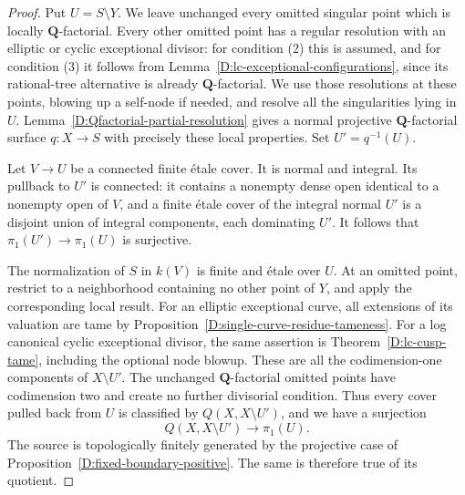 \begin{proof}
Put $U=S\setminus Y$.  We leave unchanged every omitted singular
point which is locally $\mathbf Q$-factorial.  Every other omitted
point has a regular resolution with an elliptic or cyclic
exceptional divisor: for condition (2) this is assumed, and for
condition (3) it follows from
Lemma~\ref{D:lc-exceptional-configurations}, since its rational-tree
alternative is already $\mathbf Q$-factorial.
We use those resolutions at these points, blowing up a self-node
if needed, and resolve all the singularities lying in $U$.
Lemma~\ref{D:Qfactorial-partial-resolution} gives a normal
projective $\mathbf Q$-factorial surface $q:X\to S$ with precisely
these local properties.  Set $U'=q^{-1}(U)$.

Let $V\to U$ be a connected finite \'etale cover.  It is normal
and integral.  Its pullback to $U'$ is connected: it contains a
nonempty dense open identical to a nonempty open of $V$, and a
finite \'etale cover of the integral normal $U'$ is a disjoint
union of integral components, each dominating $U'$.
It follows that $\pi_1(U')\to\pi_1(U)$ is surjective.

The normalization of $S$ in $k(V)$ is finite and \'etale over $U$.
At an omitted point, restrict to a neighborhood containing no
other point of $Y$, and apply the corresponding local result.
For an elliptic exceptional curve, all extensions of its valuation
are tame by Proposition~\ref{D:single-curve-residue-tameness}.
For a log canonical cyclic exceptional divisor, the same assertion
is Theorem~\ref{D:lc-cusp-tame}, including the optional node blowup.
These are all the codimension-one components of $X\setminus U'$.
The unchanged $\mathbf Q$-factorial omitted points have codimension
two and create no further divisorial condition.
Thus every cover pulled back from $U$ is classified by
$Q(X,X\setminus U')$, and we have a surjection
\[
 Q(X,X\setminus U')\longrightarrow\pi_1(U).
\]
The source is topologically finitely generated by the projective
case of Proposition~\ref{D:fixed-boundary-positive}.  The same is
therefore true of its quotient.
\end{proof}

